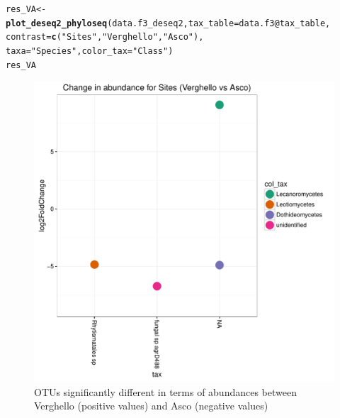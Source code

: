 \documentclass[12pt]{article}\usepackage[]{graphicx}\usepackage[]{color}
\makeatletter
\def\maxwidth{ %
  \ifdim\Gin@nat@width>\linewidth
    \linewidth
  \else
    \Gin@nat@width
  \fi
}
\newcommand{\hlstr}[1]{\textcolor[rgb]{0.192,0.494,0.8}{#1}}%
\newcommand{\hlopt}[1]{\textcolor[rgb]{0,0,0}{#1}}%
\newcommand{\hlstd}[1]{\textcolor[rgb]{0.345,0.345,0.345}{#1}}%
\newcommand{\hlkwb}[1]{\textcolor[rgb]{0.69,0.353,0.396}{#1}}%
\newcommand{\hlkwc}[1]{\textcolor[rgb]{0.333,0.667,0.333}{#1}}%
\newcommand{\hlkwd}[1]{\textcolor[rgb]{0.737,0.353,0.396}{\textbf{#1}}}%
\newenvironment{kframe}{%
 \def\at@end@of@kframe{}%
 \ifinner\ifhmode%
  \def\at@end@of@kframe{\end{minipage}}%
  \begin{minipage}{\columnwidth}%
 \fi\fi%
 \def\FrameCommand##1{\hskip\@totalleftmargin \hskip-\fboxsep
 \colorbox{shadecolor}{##1}\hskip-\fboxsep
     \hskip-\linewidth \hskip-\@totalleftmargin \hskip\columnwidth}%
 \MakeFramed {\advance\hsize-\width
   \@totalleftmargin\z@ \linewidth\hsize
   \@setminipage}}%
 {\par\unskip\endMakeFramed%
 \at@end@of@kframe}
\newenvironment{knitrout}{}{} %
\numberwithin{figure}{section}
\makeatother
\begin{document}
\begin{knitrout}\small
{}\color{fgcolor}\begin{kframe}
\begin{alltt}
\hlstd{res_VA} \hlkwb{<-} \hlkwd{plot_deseq2_phyloseq}\hlstd{(data.f3_deseq2,} \hlkwc{tax_table} \hlstd{= data.f3}\hlopt{@}\hlkwc{tax_table}\hlstd{,}
                               \hlkwc{contrast} \hlstd{=} \hlkwd{c}\hlstd{(}\hlstr{"Sites"}\hlstd{,} \hlstr{"Verghello"}\hlstd{,} \hlstr{"Asco"}\hlstd{),}
                               \hlkwc{taxa} \hlstd{=} \hlstr{"Species"}\hlstd{,} \hlkwc{color_tax} \hlstd{=} \hlstr{"Class"}\hlstd{)}
\hlstd{res_VA}
\end{alltt}
\end{kframe}\begin{figure}

{\centering \includegraphics[width=\maxwidth]{figure/unnamed-chunk-72-1} 

}

\caption[OTUs significantly different in terms of abundances between Verghello (positive values) and Asco (negative values)]{OTUs significantly different in terms of abundances between Verghello (positive values) and Asco (negative values)}\label{fig:unnamed-chunk-72}
\end{figure}


\end{knitrout}
\end{document}
